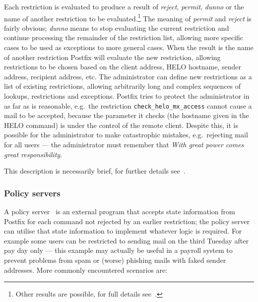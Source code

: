 \documentclass[a4paper,12pt,draft]{article}
\begin{document}
Each restriction is evaluated to produce a result of \textit{reject},
\textit{permit}, \textit{dunno\/} or the name of another restriction to be
evaluated.\footnote{Other results are possible, for full details
see~\cite{smtpd_access_readme, smtpd_per_user_control, policy-servers}.}
The meaning of \textit{permit\/} and \textit{reject\/} is fairly obvious;
\textit{dunno\/} means to stop evaluating the current restriction and
continue processing the remainder of the restriction list, allowing more
specific cases to be used as exceptions to more general cases.  When the
result is the name of another restriction Postfix will evaluate the new
restriction, allowing restrictions to be chosen based on the client \IP{}
address, HELO hostname, sender address, recipient address, etc.  The
administrator can define new restrictions as a list of existing
restrictions, allowing arbitrarily long and complex sequences of lookups,
restrictions and exceptions.  Postfix tries to protect the administrator in
as far as is reasonable, e.g.\ the restriction
\texttt{check\_helo\_mx\_access} cannot cause a mail to be accepted,
because the parameter it checks (the hostname given in the HELO command) is
under the control of the remote client.  Despite this, it is possible for
the administrator to make catastrophic mistakes, e.g.\ rejecting mail for
all users --- the administrator must remember that \textit{With great
power comes great responsibility}.

This description is necessarily brief, for further details
see~\cite{smtpd_access_readme, smtpd_per_user_control, policy-servers}.


\subsubsection{Policy servers}

\label{policy servers}

A policy server~\cite{policy-servers} is an external program that accepts
state information from Postfix for each \SMTP{} command not rejected by an
earlier restriction; the policy server can utilise that state information
to implement whatever logic is required.  For example some users can be
restricted to sending mail on the third Tuesday after pay day only --- this
example may actually be useful in a payroll system to prevent problems from
spam or (worse) phishing mails with faked sender addresses.  More commonly
encountered scenarios are:
\end{document}
